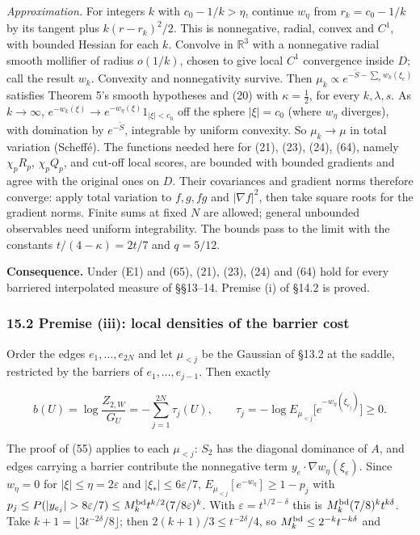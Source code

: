 \documentclass[11pt,a4paper]{article}
\begin{document}
\emph{Approximation.} For integers \(k\) with \(c_0-1/k>\eta\), continue
\(w_\eta\) from \(r_k=c_0-1/k\) by its tangent plus \(k(r-r_k)^2/2\).
This is nonnegative, radial, convex and \(C^1\), with bounded Hessian
for each \(k\). Convolve in \(\mathbb R^3\) with a nonnegative radial
smooth mollifier of radius \(o(1/k)\), chosen to give local \(C^1\)
convergence inside \(D\); call the result \(w_k\). Convexity and
nonnegativity survive. Then
\(\mu_k\propto e^{-\tilde S-\sum_ew_k(\xi_e)}\) satisfies Theorem 5's
smooth hypotheses and (20) with \(\kappa=\frac12\), for every
\(k,\lambda,s\). As \(k\to\infty\),
\(e^{-w_k(\xi)}\to e^{-w_\eta(\xi)}1_{|\xi|<c_0}\) off the sphere
\(|\xi|=c_0\) (where \(w_\eta\) diverges), with domination by
\(e^{-\tilde S}\), integrable by uniform convexity. So \(\mu_k\to\mu\)
in total variation (Scheffé). The functions needed here for (21), (23),
(24), (64), namely \(\chi_pR_p\), \(\chi_pQ_p\), and cut-off local
scores, are bounded with bounded gradients and agree with the original
ones on \(D\). Their covariances and gradient norms therefore converge:
apply total variation to \(f,g,fg\) and \(|\nabla f|^2\), then take
square roots for the gradient norms. Finite sums at fixed \(N\) are
allowed; general unbounded observables need uniform integrability. The
bounds pass to the limit with the constants \(t/(4-\kappa)=2t/7\) and
\(q=5/12\).

\textbf{Consequence.} Under (E1) and (65), (21), (23), (24) and (64)
hold for every barriered interpolated measure of §§13--14. Premise (i)
of §14.2 is proved.

\hypertarget{premise-iii-local-densities-of-the-barrier-cost}{%
\subsubsection{15.2 Premise (iii): local densities of the barrier
cost}\label{premise-iii-local-densities-of-the-barrier-cost}}

Order the edges \(e_1,\dots,e_{2N}\) and let \(\mu_{<j}\) be the
Gaussian of §13.2 at the saddle, restricted by the barriers of
\(e_1,\dots,e_{j-1}\). Then exactly

\[b(U)=\log\frac{Z_{2,W}}{G_U}=-\sum_{j=1}^{2N}\tau_j(U),\qquad
\tau_j=-\log E_{\mu_{<j}}\bigl[e^{-w_\eta(\xi_{e_j})}\bigr]\ge0.\tag{66}\]

The proof of (55) applies to each \(\mu_{<j}\): \(S_2\) has the diagonal
dominance of \(A\), and edges carrying a barrier contribute the
nonnegative term \(y_e\cdot\nabla w_\eta(\xi_e)\). Since \(w_\eta=0\)
for \(|\xi|\le\eta=2\varepsilon\) and \(|\xi_*|\le6\varepsilon/7\),
\(E_{\mu_{<j}}[e^{-w_\eta}]\ge1-p_j\) with
\(p_j\le P(|y_{e_j}|>8\varepsilon/7)\le M_k^{\rm bd}t^{k/2}(7/8\varepsilon)^k\).
With \(\varepsilon=t^{1/2-\delta}\) this is
\(M_k^{\rm bd}(7/8)^kt^{k\delta}\). Take
\(k+1=\lfloor3t^{-2\delta}/8\rfloor\); then
\(2(k+1)/3\le t^{-2\delta}/4\), so \(M_k^{\rm bd}\le2^{-k}t^{-k\delta}\)
and
\end{document}
